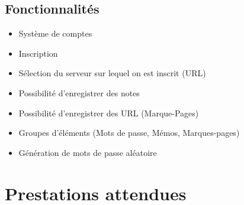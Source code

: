 \documentclass[oneside]{report}
\begin{document}
	\section{Fonctionnalités}
	{
		\begin{itemize}
			\item Système de comptes
			\item Inscription
			\item Sélection du serveur sur lequel on est inscrit (URL)
			\item Possibilité d'enregistrer des notes
			\item Possibilité d'enregistrer des URL (Marque-Pages)
			\item Groupes d'éléments (Mots de passe, Mémos, Marques-pages)
			\item Génération de mots de passe aléatoire
		\end{itemize}
	}

	\chapter{Prestations attendues}
\end{document}
